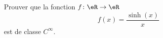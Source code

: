 

\begin{exercice}\label{exoreserve0001}

	Prouver que la fonction $f\colon \eR\to \eR$
	\begin{equation}
		f(x)=\frac{ \sinh(x) }{ x }
	\end{equation}
	est de classe $ C^{\infty}$.

\end{exercice}
